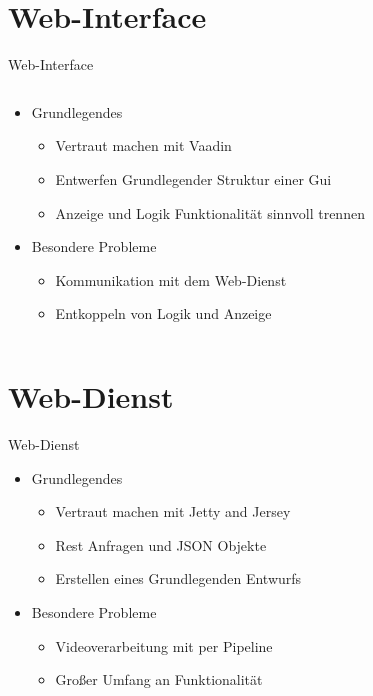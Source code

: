 \documentclass[19pt]{beamer}
\begin{document}
\section{Web-Interface}
\begin{frame}{Web-Interface}
  \begin{columns}[T]
    \begin{column}{.5\textwidth}
    		\begin{itemize}
    			\item Grundlegendes
    			\begin{itemize}
					\item Vertraut machen mit Vaadin
					\item Entwerfen Grundlegender Struktur einer Gui
					\item Anzeige und Logik Funktionalität sinnvoll trennen
				\end{itemize}
    			\item Besondere Probleme
    			\begin{itemize}
					\item Kommunikation mit dem Web-Dienst
					\item Entkoppeln von Logik und Anzeige
				\end{itemize}
    		\end{itemize}
    \end{column}
    \begin{column}{.5\textwidth}
    \end{column}
  \end{columns}
\end{frame}

\section{Web-Dienst}
\begin{frame}{Web-Dienst}
	\begin{itemize}
		\item Grundlegendes
			\begin{itemize}
				\item Vertraut machen mit Jetty and Jersey
				\item Rest Anfragen und JSON Objekte
				\item Erstellen eines Grundlegenden Entwurfs
			\end{itemize}
		\pause
		\item Besondere Probleme
			\begin{itemize}
				\item Videoverarbeitung mit per Pipeline
				\item Großer Umfang an Funktionalität
			\end{itemize}
	\end{itemize}
\end{frame}
\end{document}
